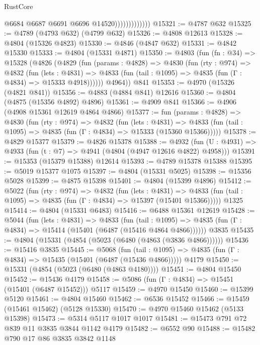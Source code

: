 \begin{lexlean}{RustCore}
\begin{coremodule}
                              @6684
                              @6687
                              @6691
                              @6696
                              @14520)))))))))))))
@15321 := @4787 @632
@15325 := @4789 (@4793 @632) (@4799 @632)
@15326 := @4808 @12613
@15328 := @4804 (@15326 @4823)
@15330 := @4846 (@4847 @632)
@15331 := @4842 @15330
@15333 := @4804 (@15331 @4871)
@15350 := @4803
    (fun (fn : @34) =>
    @15328
      (@4826
        (@4829
          (fun (params : @4828) =>
          @4830
            (fun (rty : @974) =>
            @4832
              (fun (lets : @4831) =>
              @4833 (fun (tail : @1095) => @4835 (fun (Γ : @4834) => @15333 @4918))))))
        @4964))
    @841
@15353 := @4970 (@15326 (@4821 @841))
@15356 := @4883 (@4884 @841) @12616
@15360 := @4804 (@4875 (@15356 @4892) @4896)
@15361 := @4909 @841
@15366 := @4906 (@4908 @15361 @12619 @4864 @4866)
@15377 := fun (params : @4828) =>
  @4830
    (fun (rty : @974) =>
    @4832
      (fun (lets : @4831) =>
      @4833 (fun (tail : @1095) => @4835 (fun (Γ : @4834) => @15333 (@15360 @15366)))))
@15378 := @4829 @15377
@15379 := @4826 @15378
@15388 := @4932
    (fun (U : @4931) => @4933 (fun (t : @7) => @4941 (@4804 (@4947 @12616 @4822) @4958)))
@15391 := @15353 (@15379 @15388) @12614
@15393 := @4789 @15378 @15388
@15395 := @5019 @15377 @1075
@15397 := @4804 (@15331 @5025)
@15398 := @15356 @5028
@15399 := @4875 @15398
@15401 := @4804 (@15399 @4896)
@15412 := @5022
    (fun (rty : @974) =>
    @4832
      (fun (lets : @4831) =>
      @4833 (fun (tail : @1095) => @4835 (fun (Γ : @4834) => @15397 (@15401 @15366)))))
    @1325
@15414 := @4804 (@15331 @6483)
@15416 := @6488 @15361 @12619
@15428 := @5044
    (fun (lets : @4831) =>
    @4833
      (fun (tail : @1095) =>
      @4835 (fun (Γ : @4834) => @15414 (@15401 (@6487 (@15416 @4864 @4866))))))
    @3835
@15435 := @4804 (@15331 (@4854 (@5023 (@6480 (@4863 (@3836 @4866))))))
@15436 := @15416 @3835
@15445 := @5068
    (fun (tail : @1095) => @4835 (fun (Γ : @4834) => @15435 (@15401 (@6487 (@15436 @4866)))))
    @4179
@15450 := @15331 (@4854 (@5023 (@6480 (@4863 @4180))))
@15451 := @4804 @15450
@15452 := @15436 @4179
@15458 := @5086 (fun (Γ : @4834) => @15451 (@15401 (@6487 @15452))) @5117
@15459 := @4970 @15450
@15460 := @15399 @5120
@15461 := @4804 @15460
@15462 := @6536 @15452
@15466 := @15459 (@15461 @15462) (@5128 @15330)
@15470 := @4970 @15460 @15462 (@5133 @15398)
@15473 := @5314 @5117 @1017 @1017
@15481 := @15473 @791 @72 @839 @11 @3835 @3844 @1142 @4179
@15482 := @6552 @90
@15488 := @15482 @790 @17 @86 @3835 @3842 @1148

\end{coremodule}
\end{lexlean}
